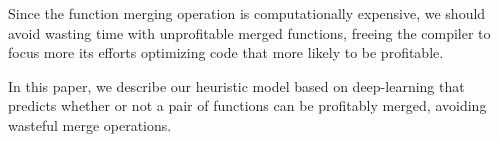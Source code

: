 Since the function merging operation is computationally expensive, we should avoid wasting time with unprofitable merged functions, freeing the compiler to focus more its efforts optimizing code that more likely to be profitable.

In this paper, we describe our heuristic model based on deep-learning that predicts whether or not a pair of functions can be profitably merged, avoiding wasteful merge operations.

